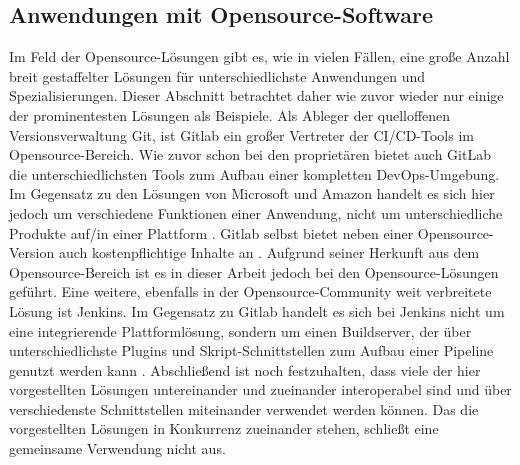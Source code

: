 \subsection{Anwendungen mit Opensource-Software}
\label{Anwendungen mit Opensource-Software}
Im Feld der Opensource-Lösungen gibt es, wie in vielen Fällen, eine große Anzahl breit gestaffelter Lösungen für unterschiedlichste Anwendungen und Spezialisierungen. Dieser Abschnitt betrachtet daher wie zuvor wieder nur einige der prominentesten Lösungen als Beispiele.
Als Ableger der quelloffenen Versionsverwaltung Git, ist Gitlab ein großer Vertreter der \acrshort{CI}/\acrshort{CD}-Tools im Opensource-Bereich. Wie zuvor schon bei den proprietären bietet auch GitLab die unterschiedlichsten Tools zum Aufbau einer kompletten \gls{DevOps}-Umgebung. Im Gegensatz zu den Lösungen von Microsoft und Amazon handelt es sich hier jedoch um verschiedene Funktionen einer Anwendung, nicht um unterschiedliche Produkte auf/in einer Plattform \cite{gitlab_devops}. Gitlab selbst bietet neben einer Opensource-Version auch kostenpflichtige Inhalte an \cite{gitlab_pricing}. Aufgrund seiner Herkunft aus dem Opensource-Bereich ist es in dieser Arbeit jedoch bei den Opensource-Lösungen geführt.
Eine weitere, ebenfalls in der Opensource-Community weit verbreitete Lösung ist Jenkins. Im Gegensatz zu Gitlab handelt es sich bei Jenkins nicht um eine integrierende Plattformlösung, sondern um einen Buildserver, der über unterschiedlichste Plugins und Skript-Schnittstellen zum Aufbau einer Pipeline genutzt werden kann \cite{jenkins_about}.
Abschließend ist noch festzuhalten, dass viele der hier vorgestellten Lösungen untereinander und zueinander interoperabel sind und über verschiedenste Schnittstellen miteinander verwendet werden können. Das die vorgestellten Lösungen in Konkurrenz zueinander stehen, schließt eine gemeinsame Verwendung nicht aus.